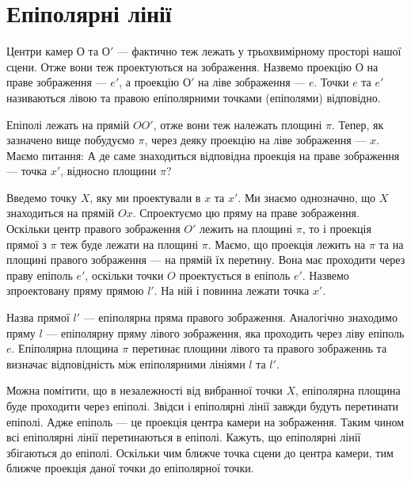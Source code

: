 \section{Епіполярні лінії}
Центри камер $О$ та $О'$ --- фактично теж лежать у трьохвимірному просторі нашої
сцени. Отже вони теж проектуються на зображення. Назвемо проекцію $О$ на праве 
зображення --- $e'$, а проекцію $О'$ на ліве зображення --- $e$. Точки $e$ та 
$e'$ називаються лівою та правою епіполярними точками (епіполями) відповідно. 

Епіполі лежать на прямій $OO'$, отже вони теж належать площині $\pi$. Тепер, 
як зазначено вище побудуємо $\pi$, через деяку проекцію на ліве зображення 
--- $x$. Маємо питання: А де саме знаходиться відповідна проекція на праве 
зображення --- точка $x'$, відносно площини $\pi$?

Введемо точку $X$, яку ми проектували в $x$ та $x'$. Ми знаємо однозначно, що 
$X$ знаходиться на прямій $Ox$. Спроектуємо цю пряму на праве зображення. 
Оскільки центр правого зображення $O'$ лежить на площині $\pi$, то і проекція
прямої з $\pi$ теж буде лежати на площині $\pi$. Маємо, що проекція лежить на 
$\pi$ та на площині правого зображення --- на прямій їх перетину. 
Вона має проходити через праву епіполь $e'$, оскільки точки $O$ проектується в
епіполь $e'$. Назвемо зпроектовану пряму прямою $l'$. На ній і повинна лежати 
точка $x'$. 

Назва прямої $l'$ --- епіполярна пряма правого зображення. Аналогічно знаходимо 
пряму $l$ --- епіполярну пряму лівого зображення, яка проходить через ліву 
епіполь $e$. Епіполярна площина $\pi$ перетинає площини лівого та правого 
зображеннь та визначає відповідність між епіполярними лініями $l$ та $l'$.

Можна помітити, що в незалежності від вибранної точки $X$, епіполярна площина 
буде проходити через епіполі. Звідси і епіполярні лінії завжди будуть перетинати 
епіполі. Адже епіполь --- це проекція центра камери на зображення. Таким чином 
всі епіполярні лінії перетинаються в епіполі. Кажуть, що епіполярні лінії
збігаються до епіполі. Оскільки чим ближче точка сцени до центра камери, тим 
ближче проекція даної точки до епіполярної точки.


